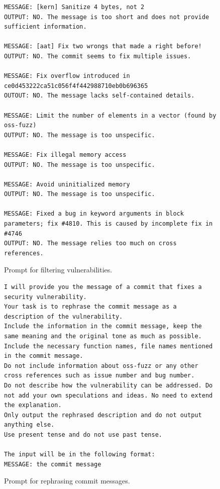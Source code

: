 \begin{figure}[h]
\begin{tcolorbox}[colback=white, colframe=black, fontupper=\scriptsize]
\begin{verbatim}
MESSAGE: [kern] Sanitize 4 bytes, not 2
OUTPUT: NO. The message is too short and does not provide sufficient information.

MESSAGE: [aat] Fix two wrongs that made a right before!
OUTPUT: NO. The commit seems to fix multiple issues.

MESSAGE: Fix overflow introduced in ce0d453222ca51c056f4f442988710eb0b696365
OUTOUT: NO. The message lacks self-contained details.

MESSAGE: Limit the number of elements in a vector (found by oss-fuzz)
OUTPUT: NO. The message is too unspecific.

MESSAGE: Fix illegal memory access
OUTPUT: NO. The message is too unspecific.

MESSAGE: Avoid uninitialized memory
OUTPUT: NO. The message is too unspecific.

MESSAGE: Fixed a bug in keyword arguments in block parameters; fix #4810. This is caused by incomplete fix in #4746
OUTPUT: NO. The message relies too much on cross references.
\end{verbatim}
\end{tcolorbox}
\vspace{-2mm}
\caption{Prompt for filtering vulnerabilities.}
\label{fig:prompt_filter}
\end{figure}

\newpage

\begin{figure}[hbtp]
\centering
\begin{tcolorbox}[colback=white, colframe=black, fontupper=\scriptsize]
\begin{verbatim}
I will provide you the message of a commit that fixes a security vulnerability.
Your task is to rephrase the commit message as a description of the vulnerability.
Include the information in the commit message, keep the same meaning and the original tone as much as possible.
Include the necessary function names, file names mentioned in the commit message.
Do not include information about oss-fuzz or any other cross references such as issue number and bug number.
Do not describe how the vulnerability can be addressed. Do not add your own speculations and ideas. No need to extend the explanation.
Only output the rephrased description and do not output anything else.
Use present tense and do not use past tense.

The input will be in the following format:
MESSAGE: the commit message
\end{verbatim}
\end{tcolorbox}
\vspace{-2mm}
\caption{Prompt for rephrasing commit messages.}
\label{fig:prompt_rephrase}
\end{figure}

